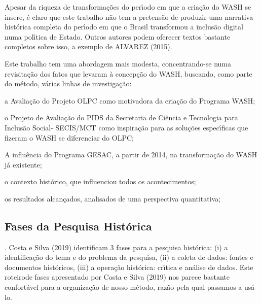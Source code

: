\documentclass[
12pt,		%
openright,	%
twoside,  %
a4paper,			%
chapter=TITLE,		%
english,			%
french,				%
spanish,			%
brazil				%
]{USPSC-classe/USPSC}
\begin{document}
Apesar da riqueza de transforma\c{c}\~oes do per\'{\i}odo em que a cria\c{c}\~ao do WASH se insere, \'e claro que este trabalho n\~ao tem a pretens\~ao de produzir uma narrativa hist\'orica completa do per\'{\i}odo em que o Brasil transformou a inclus\~ao digital numa pol\'{\i}tica de Estado. Outros autores podem oferecer textos bastante completos sobre isso, a exemplo de  ALVAREZ (2015).

















Este trabalho tem uma abordagem mais modesta, concentrando-se numa revisita\c{c}\~ao dos fatos que levaram \`a concep\c{c}\~ao do WASH, buscando, como parte do m\'etodo, v\'arias linhas de investiga\c{c}\~ao:


















\begin{alineas}
\item a Avalia\c{c}\~ao do Projeto OLPC como motivadora da cria\c{c}\~ao do Programa WASH;
\item o Projeto de Avalia\c{c}\~ao do PIDS da Secretaria de Ci\^encia e Tecnologia para Inclus\~ao Social- SECIS/MCT como inspira\c{c}\~ao para as solu\c{c}\~oes espec\'{\i}ficas que fizeram o WASH se diferenciar do OLPC;
\item A influ\^encia do Programa GESAC, a partir de 2014, na transforma\c{c}\~ao do WASH j\'a existente;
\item o contexto hist\'orico, que influenciou todos os acontecimentos;
\item os resultados alcan\c{c}ados, analisados de uma perspectiva quantitativa;
\end{alineas}

\subsection[Fases da Pesquisa Hist\'orica]{Fases da Pesquisa Hist\'orica}\label{Fases da Pesquisa Hist\'orica}
. Costa e Silva (2019) identificam 3 fases para a pesquisa hist\'orica: (i) a identifica\c{c}\~ao do tema e do problema da pesquisa, (ii) a coleta de dados: fontes e documentos hist\'oricos, (iii) a opera\c{c}\~ao hist\'orica: cr\'{\i}tica e an\'alise de dados. Este \textquotedbl roteiro\textquotedbl  de fases apresentado por  Costa e Silva (2019) nos parece bastante confort\'avel para a organiza\c{c}\~ao de nosso m\'etodo, raz\~ao pela qual passamos a us\'a-lo.
\end{document}
